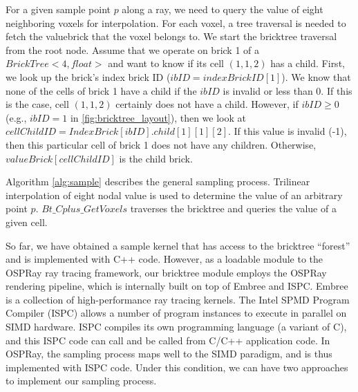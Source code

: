 For a given sample point $p$ along a ray, we need to query the value of eight
neighboring voxels for interpolation. For each voxel, a tree traversal
is needed to fetch the valuebrick that the voxel belongs to. We start the bricktree
traversal from the root node. Assume that we operate on brick 1 of a 
$BrickTree<4,float>$ and want to know if its cell $(1,1,2)$ has a child.
First, we look up the brick's index brick ID ($ibID = indexBrickID[1]$).
We know that none of the cells of brick 1 have a child if the $ibID$
is invalid or less than 0. If this is the case, cell $(1,1,2)$ certainly does not have a child.
However, if $ibID \geq 0$ (e.g., $ibID = 1$ in \autoref{fig:bricktree_layout}), 
then we look at $cellChildID = IndexBrick[ibID].child[1][1][2]$. 
If this value is invalid (-1), then this particular cell of brick 1 does not have any
children. Otherwise, $valueBrick[cellChildID]$ is the child brick.

Algorithm \ref{alg:sample} describes the general sampling process. 
Trilinear interpolation of eight nodal value is used to determine the value of an 
arbitrary point $p$. $Bt\_Cplus\_GetVoxels$ traverses the bricktree and queries the 
value of a given cell. 

So far, we have obtained a sample kernel that has access to the bricktree ``forest'' and is 
implemented with C++ code. However, as a loadable module to the OSPRay ray tracing
framework, our bricktree module employs the OSPRay rendering pipeline, which is internally
built on top of Embree\cite{wald2014embree} and ISPC\cite{pharr2012ispc}. Embree is
a collection of high-performance ray tracing kernels. 
The Intel SPMD Program Compiler (ISPC) allows a number of program instances
to execute in parallel on SIMD hardware. ISPC compiles its own programming language
(a variant of C), and this ISPC code can call and be called from C/C++ application code.
In OSPRay, the sampling process maps well to the SIMD paradigm, and is thus implemented
with ISPC code. Under this condition, we can have two approaches to implement our
sampling process. 





